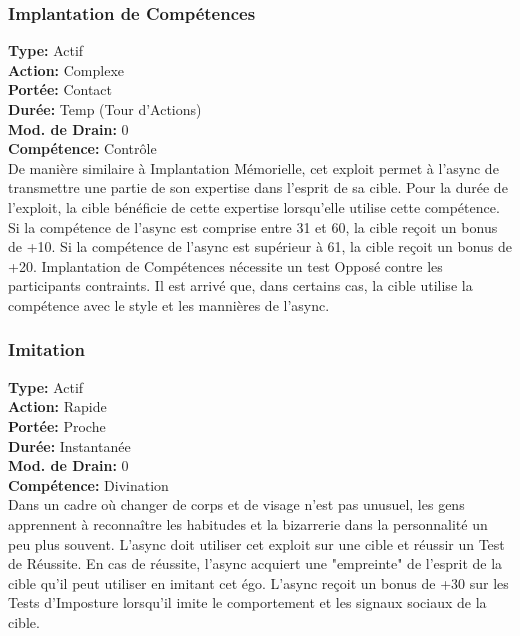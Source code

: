 \subsubsection{Implantation de Compétences} \textbf{Type:} Actif \\ \textbf{Action:} Complexe \\ \textbf{Portée:} Contact \\ \textbf{Durée:} Temp (Tour d'Actions) \\ \textbf{Mod. de Drain:} 0 \\ \textbf{Compétence:} Contrôle \\ De manière similaire à Implantation Mémorielle, cet exploit permet à l'async de transmettre une partie de son expertise dans l'esprit de sa cible. Pour la durée de l'exploit, la cible bénéficie de cette expertise lorsqu'elle utilise cette compétence. Si la compétence de l'async est comprise entre 31 et 60, la cible reçoit un bonus de +10. Si la compétence de l'async est supérieur à 61, la cible reçoit un bonus de +20. Implantation de Compétences nécessite un test Opposé contre les participants contraints. Il est arrivé que, dans certains cas, la cible utilise la compétence avec le style et les mannières de l'async. 

\subsubsection{Imitation} \textbf{Type:} Actif \\ \textbf{Action:} Rapide \\ \textbf{Portée:} Proche \\ \textbf{Durée:} Instantanée \\ \textbf{Mod. de Drain:} 0 \\ \textbf{Compétence:} Divination \\ Dans un cadre où changer de corps et de visage n'est pas unusuel, les gens apprennent à reconnaître les habitudes et la bizarrerie dans la personnalité un peu plus souvent. L'async doit utiliser cet exploit sur une cible et réussir un Test de Réussite. En cas de réussite, l'async acquiert une "empreinte" de l'esprit de la cible qu'il peut utiliser en imitant cet égo. L'async reçoit un bonus de +30 sur les Tests d'Imposture lorsqu'il imite le comportement et les signaux sociaux de la cible. 


